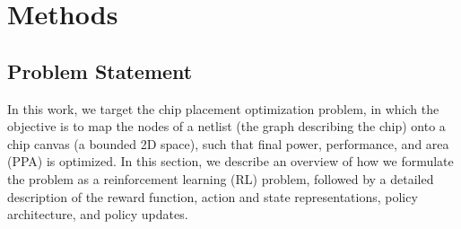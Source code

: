 \documentclass{article}
\begin{document}
\section{Methods}
\label{section:methods}

\subsection{Problem Statement}
\label{section:problem_statement}

In this work, we target the chip placement optimization problem, in which the objective is to map the nodes of a netlist (the graph describing the chip) onto a chip canvas (a bounded 2D space), such that final power, performance, and area (PPA) is optimized. In this section, we describe an overview of how we formulate the problem as a reinforcement learning (RL) problem, followed by a detailed description of the reward function, action and state representations, policy architecture, and policy updates. 

\end{document}
